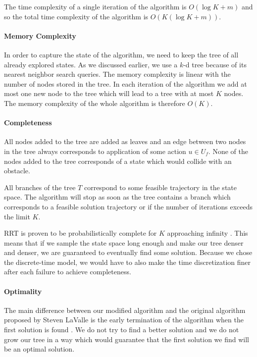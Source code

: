 The time complexity of a single iteration of the algorithm is $O(\log K + m)$ and so the total time complexity of the algorithm is $O\left(K(\log K+m)\right)$.

\paragraph{Memory Complexity}

In order to capture the state of the algorithm, we need to keep the tree of all already explored states. As we discussed earlier, we use a $k$-d tree because of its nearest neighbor search queries. The memory complexity is linear with the number of nodes stored in the tree. In each iteration of the algorithm we add at most one new node to the tree which will lead to a tree with at most $K$ nodes. The memory complexity of the whole algorithm is therefore $O(K)$.

\paragraph{Completeness}

All nodes added to the tree are added as leaves and an edge between two nodes in the tree always corresponds to application of some action $u\in U_f$. None of the nodes added to the tree corresponds of a state which would collide with an obstacle.

All branches of the tree $T$ correspond to some feasible trajectory in the state space. The algorithm will stop as soon as the tree contains a branch which corresponds to a feasible solution trajectory or if the number of iterations exceeds the limit $K$.

\gls*{RRT} is proven to be probabilistically complete for $K$ approaching infinity \cite{RRT_star}. This means that if we sample the state space long enough and make our tree denser and denser, we are guaranteed to eventually find some solution. Because we chose the discrete-time model, we would have to also make the time discretization finer after each failure to achieve completeness.

\paragraph{Optimality}

The main difference between our modified algorithm and the original algorithm proposed by Steven LaValle is the early termination of the algorithm when the first solution is found \cite{RRT}. We do not try to find a better solution and we do not grow our tree in a way which would guarantee that the first solution we find will be an optimal solution.

